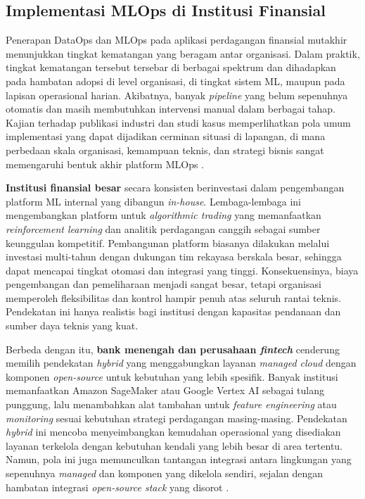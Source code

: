 \subsection{Implementasi MLOps di Institusi Finansial}

Penerapan DataOps dan MLOps pada aplikasi perdagangan finansial mutakhir menunjukkan tingkat kematangan yang beragam antar organisasi. Dalam praktik, tingkat kematangan tersebut tersebar di berbagai spektrum dan dihadapkan pada hambatan adopsi di level organisasi, di tingkat sistem ML, maupun pada lapisan operasional harian. Akibatnya, banyak \textit{pipeline} yang belum sepenuhnya otomatis dan masih membutuhkan intervensi manual dalam berbagai tahap. Kajian terhadap publikasi industri dan studi kasus memperlihatkan pola umum implementasi yang dapat dijadikan cerminan situasi di lapangan, di mana perbedaan skala organisasi, kemampuan teknis, dan strategi bisnis sangat memengaruhi bentuk akhir platform MLOps \autocite{paleyes2022challenges,kartakis2022aws,vangala2022mlops}.

\textbf{Institusi finansial besar} secara konsisten berinvestasi dalam pengembangan platform ML internal yang dibangun \textit{in-house}. Lembaga-lembaga ini mengembangkan platform untuk \textit{algorithmic trading} yang memanfaatkan \textit{reinforcement learning} dan analitik perdagangan canggih sebagai sumber keunggulan kompetitif. Pembangunan platform biasanya dilakukan melalui investasi multi-tahun dengan dukungan tim rekayasa berskala besar, sehingga dapat mencapai tingkat otomasi dan integrasi yang tinggi. Konsekuensinya, biaya pengembangan dan pemeliharaan menjadi sangat besar, tetapi organisasi memperoleh fleksibilitas dan kontrol hampir penuh atas seluruh rantai teknis. Pendekatan ini hanya realistis bagi institusi dengan kapasitas pendanaan dan sumber daya teknis yang kuat.

Berbeda dengan itu, \textbf{bank menengah dan perusahaan \textit{fintech}} cenderung memilih pendekatan \textit{hybrid} yang menggabungkan layanan \textit{managed cloud} dengan komponen \textit{open-source} untuk kebutuhan yang lebih spesifik. Banyak institusi memanfaatkan Amazon SageMaker atau Google Vertex AI sebagai tulang punggung, lalu menambahkan alat tambahan untuk \textit{feature engineering} atau \textit{monitoring} sesuai kebutuhan strategi perdagangan masing-masing. Pendekatan \textit{hybrid} ini mencoba menyeimbangkan kemudahan operasional yang disediakan layanan terkelola dengan kebutuhan kendali yang lebih besar di area tertentu. Namun, pola ini juga memunculkan tantangan integrasi antara lingkungan yang sepenuhnya \textit{managed} dan komponen yang dikelola sendiri, sejalan dengan hambatan integrasi \textit{open-source stack} yang disorot \textcite{burgueno2025toward}.

